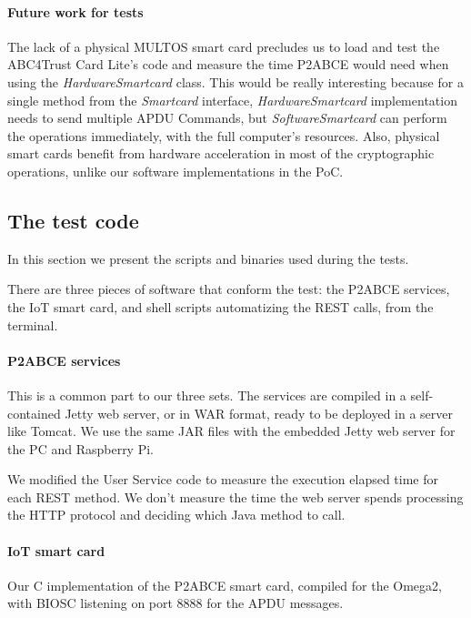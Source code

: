 \documentclass[journal]{IEEEtran}
\begin{document}
\paragraph{Future work for tests} The lack of a physical MULTOS smart card precludes us to load and test the ABC4Trust Card Lite's code and measure the time P2ABCE would need when using the \textit{HardwareSmartcard} class. This would be really interesting because for a single method from the \textit{Smartcard} interface, \textit{HardwareSmartcard} implementation needs to send multiple APDU Commands, but \textit{SoftwareSmartcard} can perform the operations immediately, with the full computer's resources. Also, physical smart cards benefit from hardware acceleration in most of the cryptographic operations, unlike our software implementations in the PoC.




\subsection{The test code}

In this section we present the scripts and binaries used during the tests.

There are three pieces of software that conform the test: the P2ABCE services, the IoT smart card, and shell scripts automatizing the REST calls, from the terminal.

\paragraph{P2ABCE services}\hfil

This is a common part to our three sets. The services are compiled in a self-contained Jetty web server, or in WAR format, ready to be deployed in a server like Tomcat. We use the same JAR files with the embedded Jetty web server for the PC and Raspberry Pi.

We modified the User Service code to measure the execution elapsed time for each REST method. We don't measure the time the web server spends processing the HTTP protocol and deciding which Java method to call.


\paragraph{IoT smart card}\hfil

Our C implementation of the P2ABCE smart card, compiled for the Omega2, with BIOSC listening on port 8888 for the APDU messages.
\end{document}
